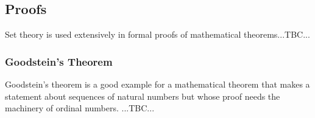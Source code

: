 



\subsection{Proofs}
Set theory is used extensively in formal proofs of mathematical theorems...TBC...

\subsubsection{Goodstein's Theorem}
Goodstein's theorem is a good example for a mathematical theorem that makes a statement about sequences of natural numbers but whose proof needs the machinery of ordinal numbers. ...TBC...




